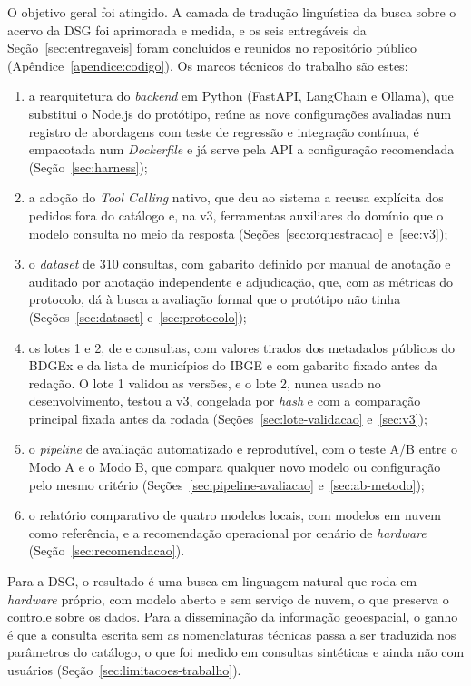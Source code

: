O objetivo geral foi atingido. A camada de tradução linguística da busca sobre o acervo da DSG foi aprimorada e medida, e os seis entregáveis da Seção~\ref{sec:entregaveis} foram concluídos e reunidos no repositório público (Apêndice~\ref{apendice:codigo}). Os marcos técnicos do trabalho são estes:
\begin{enumerate}
  \item a rearquitetura do \textit{backend} em Python (FastAPI, LangChain e Ollama), que substitui o Node.js do protótipo, reúne as nove configurações avaliadas num registro de abordagens com teste de regressão e integração contínua, é empacotada num \textit{Dockerfile} e já serve pela API a configuração recomendada (Seção~\ref{sec:harness});
  \item a adoção do \textit{Tool Calling} nativo, que deu ao sistema a recusa explícita dos pedidos fora do catálogo e, na v3, ferramentas auxiliares do domínio que o modelo consulta no meio da resposta (Seções~\ref{sec:orquestracao} e~\ref{sec:v3});
  \item o \textit{dataset} de 310 consultas, com gabarito definido por manual de anotação e auditado por anotação independente e adjudicação, que, com as métricas do protocolo, dá à busca a avaliação formal que o protótipo não tinha (Seções~\ref{sec:dataset} e~\ref{sec:protocolo});
  \item os lotes 1 e 2, de  e  consultas, com valores tirados dos metadados públicos do BDGEx e da lista de municípios do IBGE e com gabarito fixado antes da redação. O lote 1 validou as versões, e o lote 2, nunca usado no desenvolvimento, testou a v3, congelada por \textit{hash} e com a comparação principal fixada antes da rodada (Seções~\ref{sec:lote-validacao} e~\ref{sec:v3});
  \item o \textit{pipeline} de avaliação automatizado e reprodutível, com o teste A/B entre o Modo A e o Modo B, que compara qualquer novo modelo ou configuração pelo mesmo critério (Seções~\ref{sec:pipeline-avaliacao} e~\ref{sec:ab-metodo});
  \item o relatório comparativo de quatro modelos locais, com  modelos em nuvem como referência, e a recomendação operacional por cenário de \textit{hardware} (Seção~\ref{sec:recomendacao}).
\end{enumerate}

Para a DSG, o resultado é uma busca em linguagem natural que roda em \textit{hardware} próprio, com modelo aberto e sem serviço de nuvem, o que preserva o controle sobre os dados. Para a disseminação da informação geoespacial, o ganho é que a consulta escrita sem as nomenclaturas técnicas passa a ser traduzida nos parâmetros do catálogo, o que foi medido em consultas sintéticas e ainda não com usuários (Seção~\ref{sec:limitacoes-trabalho}).

